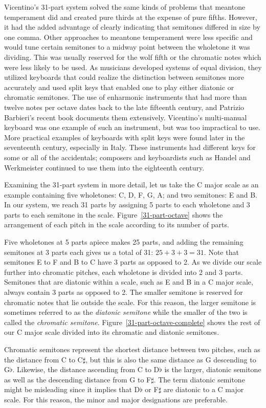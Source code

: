 Vicentino's 31-part system solved the same kinds of problems that meantone temperament
did and created pure thirds at the expense of pure fifths. However, it had
the added advantage of clearly indicating that semitones differed in size by one comma.
Other approaches to meantone temperament were less specific and would
tune certain semitones to a midway point between the wholetone it was dividing.  This
was usually reserved for the wolf fifth or the chromatic notes which were less likely
to be used.  As musicians developed systems of equal division, they utilized keyboards
that could realize the distinction between semitones more accurately and used split
keys that enabled one to play either diatonic or chromatic semitones.  The use of
enharmonic instruments that had more than twelve notes per octave dates back to the
late fifteenth century, and Patrizio Barbieri's recent book documents them
extensively.\autocite{PB:1} Vicentino's multi-manual keyboard was one example of such
an instrument, but was too impractical to use. More practical examples of keyboards
with split keys were found later in the seventeenth century, especially in Italy. These
instruments had different keys for some or all of the accidentals; composers and keyboardists
such as Handel and Werkmeister continued to use them into the eighteenth century.
\autocite[108]{MB:1}

Examining the 31-part system in more detail, let us take the C major scale as an example containing
five wholetones: C, D, F, G, A; and two semitones: E and B. In our system, we reach 31 parts by
assigning 5 parts to each wholetone and 3 parts to each semitone in the scale.  
Figure~\ref{31-part-octave} shows the arrangement of each pitch in the scale according to its number of parts.
 
Five wholetones at 5 parts apiece makes 25 parts, and adding
the remaining semitones at 3 parts each gives us a total of 31: $ 25 + 3 + 3 = 31 $. Note that
semitones E to F and B to C have 3 parts as opposed to 2.  As we divide our scale further into
chromatic pitches, each wholetone is divided into 2 and 3 parts.  Semitones that are diatonic within
a scale, such as E and B in a C major scale, always contain 3 parts as opposed to 2. The smaller
semitone is reserved for chromatic notes that lie outside the scale. For this reason, the larger
semitone is sometimes referred to as the \textit{diatonic semitone} while the smaller of the two is
called the \textit{chromatic semitone}. Figure~\ref{31-part-octave-complete} shows the rest of our C
major scale divided into its chromatic and diatonic semitones. 
 
Chromatic semitones represent the shortest distance between two pitches, such as the
distance from C to C$\sharp$, but this is also the same distance as G descending to G$\flat$.
Likewise, the distance ascending from C to D$\flat$ is the larger, diatonic semitone as well as the
descending distance from G to F$\sharp$. The term diatonic semitone might be misleading since it
implies that D$\flat$ or F$\sharp$ are diatonic to a C major scale.  For this reason, the minor and
major designations are preferable.

